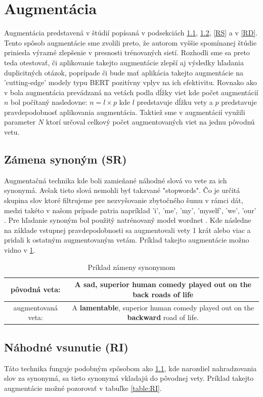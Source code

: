 \documentclass[a4paper, 16pt]{article}
\begin{document}
\section{Augmentácia}
\label{augmentation}
Augmentácia predstavená v štúdií \cite{augmentation} popísaná v podsekciách \ref{SR}, \ref{RI}, \ref{RS} a v \ref{RD}. Tento spôsob augmentácie sme zvolili preto, že autorom vyššie spomínanej štúdie priniesla výrazné zlepšenie v presnosti trénovaných sietí. Rozhodli sme sa preto teda otestovať, či aplikovanie takejto augmentácie zlepší aj výsledky hľadania duplicitných otázok, poprípade či bude mať aplikácia takejto augmentácie na 'cutting-edge' modely typu BERT pozitívny vplyv na ich efektivitu. Rovnako ako v \cite{augmentation} bola augmentácia prevádzaná na vetách podla dĺžky viet kde počet augmentácií $n$ bol počítaný nasledovne: $n = l \times p$ kde $l$ predstavuje dĺžku vety a $p$ predstavuje pravdepodobnosť aplikovania augmentácia. Taktiež sme v augmentácií využili parameter $N$ ktorí určoval celkový počet augmentovaných viet na jednu pôvodnú vetu.

\subsection{Zámena synoným (SR)}
\label{SR}
Augmentačná technika kde boli zamieňané náhodné slová vo vete za ich synonymá. Avšak tieto slová nemohli byť takzvané "stopwords". Čo je určitá skupina slov ktoré filtrujeme pre nezvyšovanie zbytočného šumu v rámci dát, medzi takéto v našom prípade patria napríklad 'i', 'me', 'my', 'myself', 'we', 'our' \cite{stop_words}. Pre hľadanie synoným bol použitý natrénovaný model wordnet \cite{wordnet}. Kde následne na základe vstupnej pravdepodobnosti sa augmentovali vety 1 krát alebo viac a pridali k ostatným augmentovaným vetám. Príklad takejto augmentácie možno vidno v \ref{table:SR}. 

\begin{table}[H]
\centering
\begin{tabular}{ |c|c| } \hline
pôvodná veta: & A sad, superior human comedy played out on the back roads of life\\ \hline
augmentovaná veta: & A \textbf{lamentable}, superior human comedy played out on the \textbf{backward} road of life. \\ \hline
\end{tabular}
\caption{Príklad zámeny synonymom}
\label{table:SR}
\end{table}

\subsection{Náhodné vsunutie (RI)}
\label{RI}
Táto technika funguje podobným spôsobom ako \ref{SR}, kde narozdiel nahradzovania slov za synonymá, sa tieto synonymá vkladajú do pôvodnej vety. Príklad takejto augmentácie možné pozorovať v tabuľke \ref{table:RI}.
\end{document}
